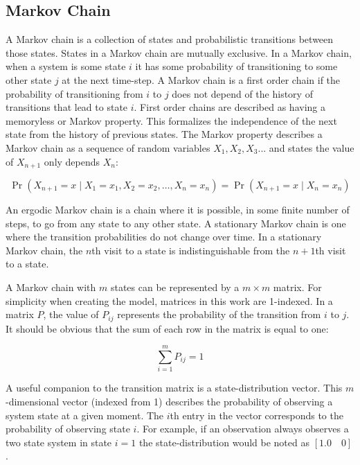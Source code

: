\subsection{Markov Chain}


A Markov chain is a collection of states and probabilistic transitions between those states.
States in a Markov chain are mutually exclusive.
In a Markov chain, when a system is some state $i$ it has some probability of transitioning to some other state $j$ at the next time-step.
A Markov chain is a first order chain if the probability of transitioning from $i$ to $j$ does not depend of the history of transitions that lead to state $i$.
First order chains are described as having a memoryless or Markov property.
This formalizes the independence of the next state from the history of previous states.
The Markov property describes a Markov chain as a sequence of random variables $X_{1}, X_{2}, X_{3}...$ and states the value of $X_{n+1}$ only depends $X_{n}$: \cite{MARKOV3}

\[ \Pr(X_{n+1}=x\mid X_1=x_1, X_2=x_2, \ldots, X_n=x_n) = \Pr(X_{n+1}=x\mid X_n=x_n) \]

An ergodic Markov chain is a chain where it is possible, in some finite number of steps, to go from any state to any other state.
A stationary Markov chain is one where the transition probabilities do not change over time.
In a stationary Markov chain, the $n$th visit to a state is indistinguishable from the $n+1$th visit to a state.

A Markov chain with $m$ states can be represented by a $m\times m$ matrix.
For simplicity when creating the model, matrices in this work are 1-indexed.
In a matrix $P$, the value of $P_{ij}$ represents the probability of the transition from $i$ to $j$.
It should be obvious that the sum of each row in the matrix is equal to one:

\[ \sum_{i=1}^{m} P_{ij} = 1 \]

A useful companion to the transition matrix is a state-distribution vector.
This $m$-dimensional vector (indexed from 1) describes the probability of observing a system state at a given moment.
The $i$th entry in the vector corresponds to the probability of observing state $i$.
For example, if an observation always observes a two state system in state $i=1$ the state-distribution would be noted as $[1.0 \quad 0]$.

